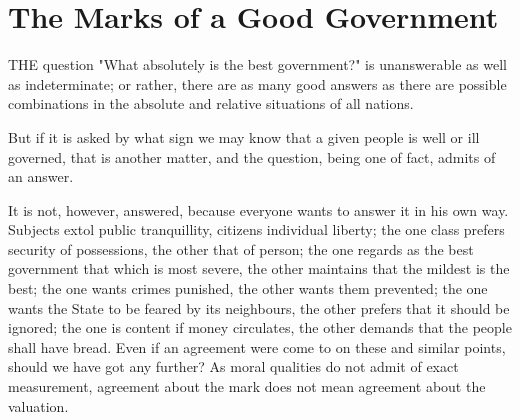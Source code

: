 \documentclass[12pt]{report}
\begin{document}
\section{The Marks of a Good Government}
THE question "What absolutely is the best government?" is unanswerable as well as indeterminate; or rather, there are as many good answers as there are possible combinations in the absolute and relative situations of all nations.

But if it is asked by what sign we may know that a given people is well or ill governed, that is another matter, and the question, being one of fact, admits of an answer.

It is not, however, answered, because everyone wants to answer it in his own way. Subjects extol public tranquillity, citizens individual liberty; the one class prefers security of possessions, the other that of person; the one regards as the best government that which is most severe, the other maintains that the mildest is the best; the one wants crimes punished, the other wants them prevented; the one wants the State to be feared by its neighbours, the other prefers that it should be ignored; the one is content if money circulates, the other demands that the people shall have bread. Even if an agreement were come to on these and similar points, should we have got any further? As moral qualities do not admit of exact measurement, agreement about the mark does not mean agreement about the valuation.
\end{document}
